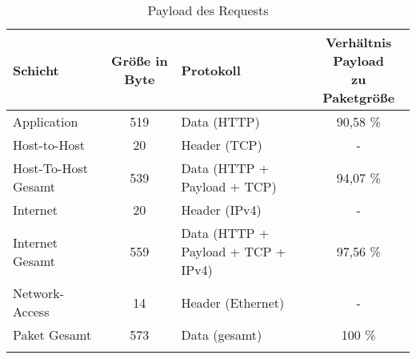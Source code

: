 \begin{longtable}[width=\textwidth]{l|c|l|c}
    \hline
    Schicht & Größe in Byte & Protokoll & \makecell[l]{Verhältnis Payload \\zu Paketgröße}
    \\\hline
    Application & 519 & Data (HTTP) & 90,58 \%
    \\\hline
    Host-to-Host & 20 & Header (TCP) & -
    \\\hline
    Host-To-Host Gesamt & 539 & Data (HTTP + Payload + TCP) & 94,07 \%
    \\\hline
    Internet & 20 & Header (IPv4) & -
    \\\hline
    Internet Gesamt & 559 & Data (HTTP + Payload + TCP + IPv4) & 97,56 \%
    \\\hline
    Network-Access & 14 & Header (Ethernet) & - 
    \\\hline
    Paket Gesamt & 573 & Data (gesamt) & 100 \%
    \\
    \caption{Payload des Requests}
\end{longtable}